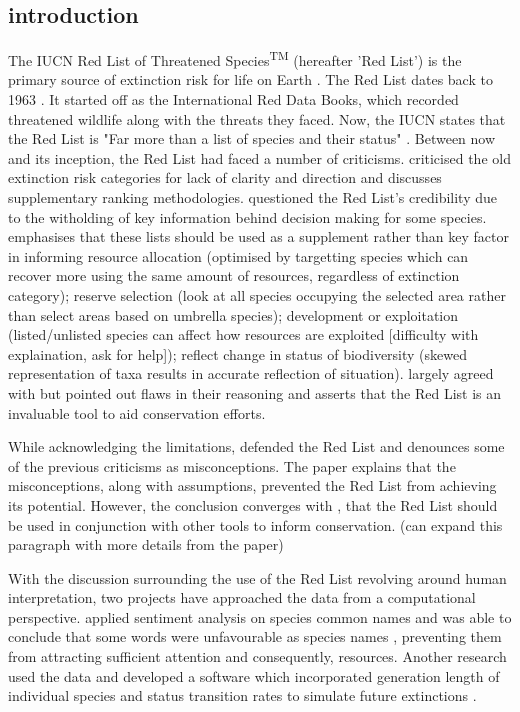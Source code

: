 \subsection{introduction}

The IUCN Red List of Threatened Species\textsuperscript{TM} (hereafter 'Red List') is the primary source of extinction risk for life on Earth \parencite{iucn2021, rodrigues2006value, lamoreux2003value}. The Red List dates back to 1963 \parencite{scott1987red}. It started off as the International Red Data Books, which recorded threatened wildlife along with the threats they faced. Now, the IUCN states that the Red List is "Far more than a list of species and their status" \parencite{iucn2021}. Between now and its inception, the Red List had faced a number of criticisms. \textcite{master1991assessing} criticised the old extinction risk categories for lack of clarity and direction and discusses supplementary ranking methodologies. \textcite{mrosovsky1997iucn} questioned the Red List's credibility due to the witholding of key information behind decision making for some species. \textcite{possingham2002limits} emphasises that these lists should be used as a supplement rather than key factor in informing resource allocation (optimised by targetting species which can recover more using the same amount of resources, regardless of extinction category); reserve selection (look at all species occupying the selected area rather than select areas based on umbrella species); development or exploitation (listed/unlisted species can affect how resources are exploited [difficulty with explaination, ask for help]); reflect change in status of biodiversity (skewed representation of taxa results in accurate reflection of situation). \textcite{lamoreux2003value} largely agreed with \textcite*{possingham2002limits} but pointed out flaws in their reasoning and asserts that the Red List is an invaluable tool to aid conservation efforts. 

While acknowledging the limitations, \textcite{rodrigues2006value} defended the Red List and denounces some of the previous criticisms as misconceptions. The paper explains that the misconceptions, along with assumptions, prevented the Red List from achieving its potential. However, the conclusion converges with \textcite{possingham2002limits}, that the Red List should be used in conjunction with other tools to inform conservation. (can expand this paragraph with more details from the paper)

With the discussion surrounding the use of the Red List revolving around human interpretation, two projects have approached the data from a computational perspective. \textcite{gregg2020many} applied sentiment analysis on species common names and was able to conclude that some words were unfavourable as species names \parencite{gregg2020many}, preventing them from attracting sufficient attention and consequently, resources. Another research used the data and developed a software which incorporated generation length of individual species and status transition rates to simulate future extinctions \parencite{andermann2021iucn_sim}.

